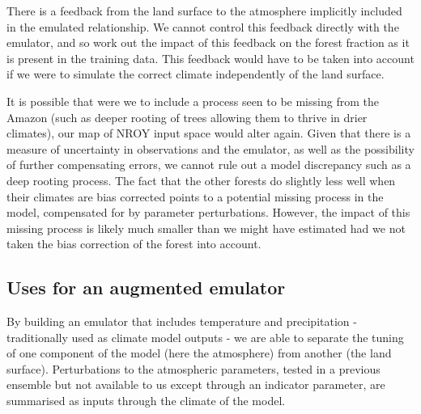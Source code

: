 \documentclass[gmd, manuscript]{copernicus}
\begin{document}
There is a feedback from the land surface to the atmosphere implicitly included in the emulated relationship. We cannot control this feedback directly with the emulator, and so work out the impact of this feedback on the forest fraction as it is present in the training data. This feedback would have to be taken into account if we were to simulate the correct climate independently of the land surface.

It is possible that were we to include a process seen to be missing from the Amazon (such as deeper rooting of trees allowing them to thrive in drier climates), our map of NROY input space would alter again. Given that there is a measure of uncertainty in observations and the emulator, as well as the possibility of further compensating errors, we cannot rule out a model discrepancy such as a deep rooting process. The fact that the other forests do slightly less well when their climates are bias corrected points to a potential missing process in the model, compensated for by parameter perturbations. However, the impact of this missing process is likely much smaller than we might have estimated had we not taken the bias correction of the forest into account.


\subsection{Uses for an augmented emulator}\label{ssec:uses}
By building an emulator that includes temperature and precipitation - traditionally used as climate model outputs - we are able to separate the tuning of one component of the model (here the atmosphere) from another (the land surface). Perturbations to the atmospheric parameters, tested in a previous ensemble but not available to us except through an indicator parameter, are summarised as inputs through the climate of the model.
\end{document}
